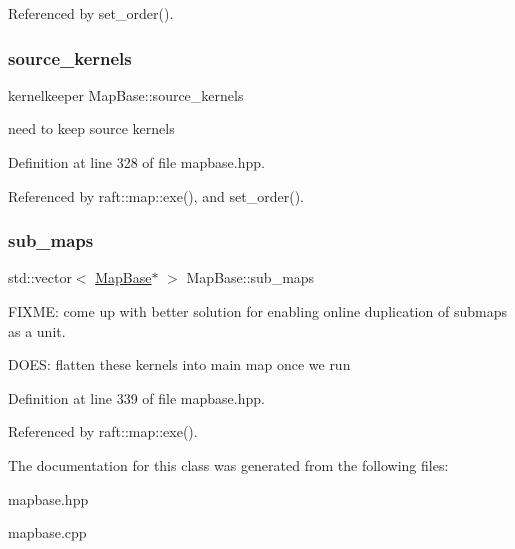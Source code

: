 Referenced by set\+\_\+order().

\hypertarget{class_map_base_a2541cb37a237e66fc88129f9f0b02f50}{}\label{class_map_base_a2541cb37a237e66fc88129f9f0b02f50} 
\subsubsection{\texorpdfstring{source\+\_\+kernels}{source\_kernels}}
{\footnotesize\ttfamily kernelkeeper Map\+Base\+::source\+\_\+kernels\hspace{0.3cm}{\ttfamily [protected]}}

need to keep source kernels 

Definition at line 328 of file mapbase.\+hpp.



Referenced by raft\+::map\+::exe(), and set\+\_\+order().

\hypertarget{class_map_base_abc4856ed552e77510211851f0a4a02ab}{}\label{class_map_base_abc4856ed552e77510211851f0a4a02ab} 
\subsubsection{\texorpdfstring{sub\+\_\+maps}{sub\_maps}}
{\footnotesize\ttfamily std\+::vector$<$ \hyperlink{class_map_base}{Map\+Base}$\ast$ $>$ Map\+Base\+::sub\+\_\+maps\hspace{0.3cm}{\ttfamily [protected]}}

F\+I\+X\+ME\+: come up with better solution for enabling online duplication of submaps as a unit.

D\+O\+ES\+: flatten these kernels into main map once we run 

Definition at line 339 of file mapbase.\+hpp.



Referenced by raft\+::map\+::exe().



The documentation for this class was generated from the following files\+:\begin{DoxyCompactItemize}
\item 
mapbase.\+hpp\item 
mapbase.\+cpp\end{DoxyCompactItemize}
